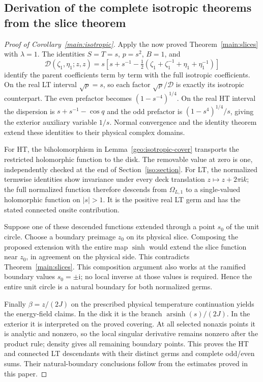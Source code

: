 \documentclass[11pt]{article}
\numberwithin{equation}{section}
\theoremstyle{definition}
\newcommand{\ii}{\mathrm i}
\begin{document}
\subsection{Derivation of the complete isotropic theorems from the slice theorem}

\begin{proof}[Proof of Corollary~\ref{main:isotropic}]
Apply the now proved Theorem~\ref{main:slices} with \(\lambda=1\).
The identities \(S=T=s\), \(p=s^2\), \(B=1\), and
\[
 \mathcal D(\zeta_1,\eta_1;z,z)
 =s\left[s+s^{-1}
 -\tfrac12(\zeta_1+\zeta_1^{-1}+\eta_1+\eta_1^{-1})\right]
\]
identify the parent coefficients term by term with the full isotropic
coefficients. On the real LT interval \(\sqrt p=s\), so each
factor \(\sqrt p/\mathcal D\) is exactly its isotropic counterpart.
The even prefactor becomes \((1-s^{-4})^{1/4}\). On the real HT
interval the dispersion is \(s+s^{-1}-\cos q\) and the odd
prefactor is \((1-s^4)^{1/4}/s\), giving the exterior auxiliary
variable \(1/s\). Normal convergence and the identity theorem
extend these identities to their physical complex domains.

For HT, the biholomorphism in Lemma~\ref{geo:isotropic-cover}
transports the restricted holomorphic function to the disk. The
removable value at zero is one, independently checked at the end
of Section~\ref{iso:section}. For LT, the normalized termwise
identities show invariance under every deck translation
\(z\mapsto z+2\pi\ii k\); the full normalized function therefore
descends from \(\Omega_{L,1}\) to a single-valued holomorphic
function on \(|s|>1\). It is the positive real LT germ and has
the stated connected onsite contribution.

Suppose one of these descended functions extended through a point
\(s_0\) of the unit circle. Choose a boundary preimage \(z_0\)
on its physical slice. Composing the proposed extension with the
entire map \(\sinh\) would extend the slice function near
\(z_0\), in agreement on the physical side. This contradicts
Theorem~\ref{main:slices}. This composition argument also works
at the ramified boundary values \(s_0=\pm\ii\); no local inverse
at those values is required. Hence the entire unit circle is a
natural boundary for both normalized germs.

Finally \(\beta=z/(2J)\) on the prescribed physical temperature
continuation yields the energy-field claims. In the disk it is
the branch \(\operatorname{arsinh}(s)/(2J)\). In the exterior it
is interpreted on the proved covering. At all selected nonaxis
points it is analytic and nonzero, so the local singular
derivative remains nonzero after the product rule; density gives
all remaining boundary points. This proves the HT and connected LT descendants with their
distinct germs and complete odd/even sums. Their natural-boundary
conclusions follow from the estimates proved in this paper.
\end{proof}
\end{document}
